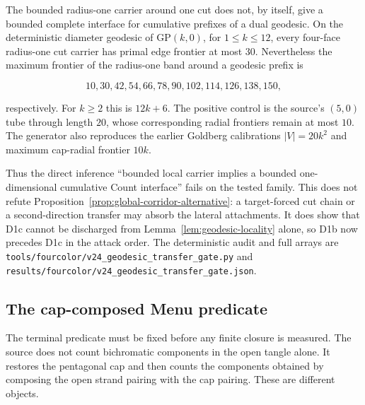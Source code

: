 \begin{proposition}
\label{prop:geodesic-transfer-small-case-gate}
\Sprose
The bounded radius-one carrier around one cut does not, by itself, give a
bounded complete interface for cumulative prefixes of a dual geodesic.  On
the deterministic diameter geodesic of \(\mathrm{GP}(k,0)\), for
\(1\le k\le12\), every four-face radius-one cut carrier has primal edge
frontier at most $30$.  Nevertheless the maximum frontier of the
radius-one band around a geodesic prefix is

\[
  10,30,42,54,66,78,90,102,114,126,138,150,
\]

respectively.  For $k\ge2$ this is $12k+6$.  The positive control is the
source's \((5,0)\) tube through length $20$, whose corresponding radial
frontiers remain at most $10$.  The generator also reproduces the earlier
Goldberg calibrations $|V|=20k^2$ and maximum cap-radial frontier $10k$.

Thus the direct inference ``bounded local carrier implies a bounded
one-dimensional cumulative Count interface'' fails on the tested family.
This does not refute Proposition~\ref{prop:global-corridor-alternative}: a
target-forced cut chain or a second-direction transfer may absorb the lateral
attachments.  It does show that D1c cannot be discharged from
Lemma~\ref{lem:geodesic-locality} alone, so D1b now precedes D1c in the attack
order.  The deterministic audit and full arrays are
\texttt{tools/fourcolor/v24\_geodesic\_transfer\_gate.py} and
\texttt{results/fourcolor/v24\_geodesic\_transfer\_gate.json}.
\end{proposition}

\subsection{The cap-composed Menu predicate}

The terminal predicate must be fixed before any finite closure is measured.
The source does not count bichromatic components in the open tangle alone.
It restores the pentagonal cap and then counts the components obtained by
composing the open strand pairing with the cap pairing.  These are different
objects.

